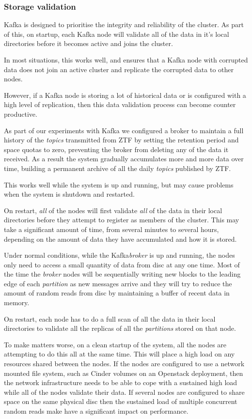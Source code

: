 \documentclass{article}
\newcommand{\openstack} {Openstack\xspace}
\newcommand{\kafka} {Kafka\xspace}
\newcommand{\kftopics} {\textit{topics}\xspace}
\newcommand{\kfbroker} {\textit{broker}\xspace}
\newcommand{\kfpartition} {\textit{partition}\xspace}
\newcommand{\kfpartitions} {\textit{partitions}\xspace}
\newcommand{\ztf} {ZTF\xspace}
\begin{document}
\subsubsection{Storage validation}
\label{storage-validation}

\kafka is designed to prioritise the integrity and reliability of the cluster.
As part of this, on startup, each \kafka node will validate all of the data in it's local directories before it becomes active and joins the cluster.

In most situations, this works well, and ensures that a \kafka node with corrupted data does not join an active cluster and replicate the corrupted data to other nodes.

However, if a \kafka node is storing a lot of historical data or is configured with a high level of replication, then this data validation process can become counter productive.

As part of our experiments with \kafka we configured a broker to maintain a full history of the \kftopics transmitted from \ztf by setting the retention period and space quotas to zero, preventing the broker from deleting any of the data it received.
As a result the system gradually accumulates more and more data over time, building a permanent archive of all the daily \kftopics published by \ztf.

This works well while the system is up and running, but may cause problems when the system is shutdown and restarted.

On restart, \textit{all} of the nodes will first validate \textit{all} of the data in their local directories before they attempt to register as members of the cluster.
This may take a significant amount of time, from several minutes to several hours, depending on the amount of data they have accumulated and how it is stored.

Under normal conditions, while the \kafka \kfbroker is up and running, the nodes only need to access a small quantity of data from disc at any one time. 
Most of the time the \kfbroker nodes will be sequentially writing new blocks to the leading edge of each \kfpartition as new messages arrive and they will try to reduce the amount of random reads from disc by maintaining a buffer of recent data in memory.

On restart, each node has to do a full scan of all the data in their local directories to validate all the replicas of all the \kfpartitions stored on that node.

To make matters worse, on a clean startup of the system, all the nodes are attempting to do this all at the same time. This will place a high load on any resources shared between the nodes.
If the nodes are configured to use a network mounted file system, such as Cinder volumes on an \openstack deployment, then the network infrastructure needs to be able to cope with a sustained high load while all of the nodes validate their data.
If several nodes are configured to share space on the same physical disc then the sustained load of multiple concurrent random reads make have a significant impact on performance.
\end{document}
